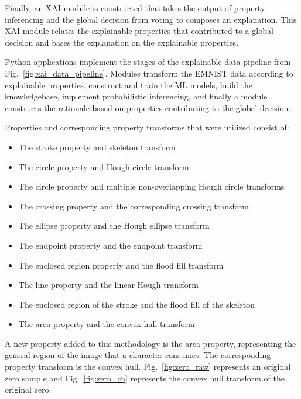 \documentclass[conference]{IEEEtran}
\begin{document}
Finally, an XAI module is constructed that takes the output of property
inferencing and the global decision from voting to composes an explanation.
This XAI module relates the explainable properties that contributed to a global
decision and bases the explanation on the explainable properties.

Python applications implement the stages of the explainable data pipeline from
Fig.~\ref{fig:xai_data_pipeline}. Modules transform the EMNIST data according to
explainable properties, construct and train the ML models, build the
knowledgebase, implement probabilistic inferencing, and finally a module
constructs the rationale based on properties contributing to the global
decision.

Properties and corresponding property transforms that were utilized consist of:
\begin{itemize}
    \item The stroke property and skeleton transform
    \item The circle property and Hough circle transform
    \item The circle property and multiple non-overlapping Hough circle transforms
    \item The crossing property and the corresponding crossing transform
    \item The ellipse property and the Hough ellipse transform
    \item The endpoint property and the endpoint transform
    \item The enclosed region property and the flood fill transform
    \item The line property and the linear Hough transform
    \item The enclosed region of the stroke and the flood fill of the skeleton
    \item The area property and the convex hull transform
\end{itemize}

A new property added to this methodology is the area property, representing the general
region of the image that a character consumes. The corresponding
property transform is the convex hull. Fig.~\ref{fig:zero_raw} represents an
original zero sample and Fig.~\ref{fig:zero_ch} represents the convex hull
transform of the original zero.
\end{document}
